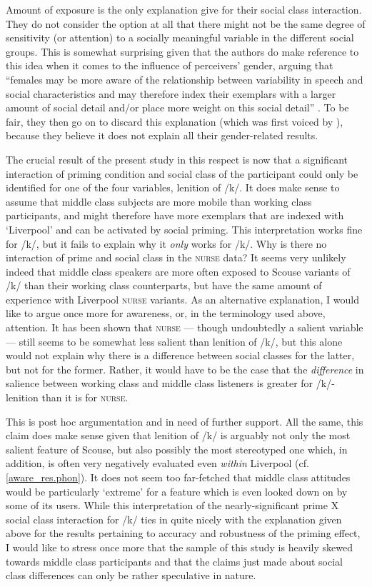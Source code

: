 Amount of exposure is the only explanation \citeauthor{haydrager2010} give for their social class interaction.
They do not consider the option at all that there might not be the same degree of sensitivity (or attention) to a socially meaningful variable in the different social groups.
This is somewhat surprising given that the authors do make reference to this idea when it comes to the influence of perceivers' gender, arguing that ``females may be more aware of the relationship between variability in speech and social characteristics and may therefore index their exemplars with a larger amount of social detail and/or place more weight on this social detail'' \parencite[884]{haydrager2010}.
To be fair, they then go on to discard this explanation (which was first voiced by \cite{drager2005}), because they believe it does not explain all their gender-related results.

The crucial result of the present study in this respect is now that a significant interaction of priming condition and social class of the participant could only be identified for one of the four variables, lenition of /k/.
It does make sense to assume that middle class subjects are more mobile than working class participants, and might therefore have more exemplars that are indexed with `Liverpool' and can be activated by social priming.
This interpretation works fine for /k/, but it fails to explain why it \emph{only} works for /k/.
Why is there no interaction of prime and social class in the \textsc{nurse} data?
It seems very unlikely indeed that middle class speakers are more often exposed to Scouse variants of /k/ than their working class counterparts, but have the same amount of experience with Liverpool \textsc{nurse} variants.
As an alternative explanation, I would like to argue once more for awareness, or, in the terminology used above, attention.
It has been shown that \textsc{nurse} --- though undoubtedly a salient variable --- still seems to be somewhat less salient than lenition of /k/, but this alone would not explain why there is a difference between social classes for the latter, but not for the former.
Rather, it would have to be the case that the \emph{difference} in salience between working class and middle class listeners is greater for /k/-lenition than it is for \textsc{nurse}.

This is post hoc argumentation and in need of further support.
All the same, this claim does make sense given that lenition of /k/ is arguably not only the most salient feature of Scouse, but also possibly the most stereotyped one which, in addition, is often very negatively evaluated even \emph{within} Liverpool (cf. \ref{aware_res.phon}).
It does not seem too far-fetched that middle class attitudes would be particularly `extreme' for a feature which is even looked down on by some of its users.
While this interpretation of the nearly-significant prime X social class interaction for /k/ ties in quite nicely with the explanation given above for the results pertaining to accuracy and robustness of the priming effect, I would like to stress once more that the sample of this study is heavily skewed towards middle class participants and that the claims just made about social class differences can only be rather speculative in nature.

